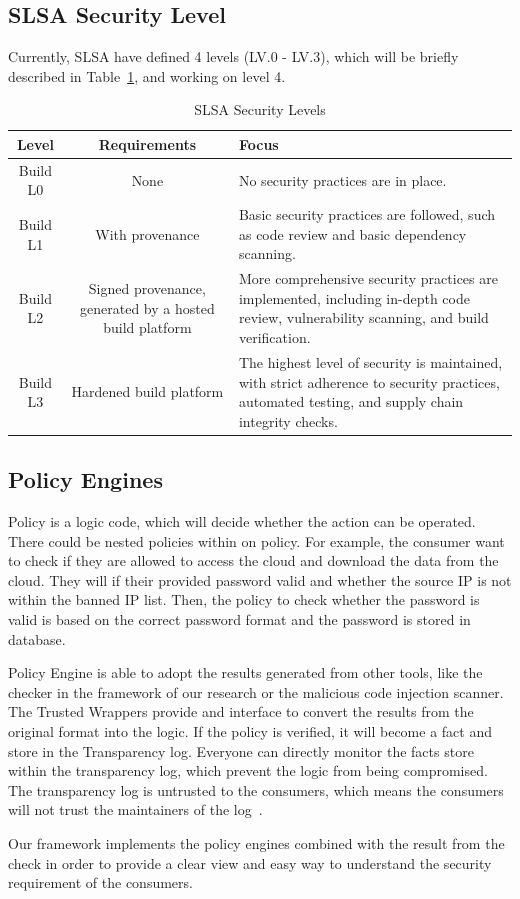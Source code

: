 \subsection{SLSA Security Level}
Currently, SLSA have defined 4 levels (LV.0 - LV.3), which will be 
briefly described in Table~\ref{tab:slsa-levels}, and working on level 4.
\begin{table}[ht]
  \centering
  \caption{SLSA Security Levels}
  \label{tab:slsa-levels}
  \begin{tabular}{|c|c|p{6cm}|}
  \hline
  \textbf{Level} & \textbf{Requirements} & \textbf{Focus} \\
  \hline
  Build L0 & None & No security practices are in place. \\
  \hline
  Build L1 & With provenance & Basic security practices are followed, such as code review and basic dependency scanning. \\
  \hline
  Build L2 & Signed provenance, generated by a hosted build platform & More comprehensive security practices are implemented, including in-depth code review, vulnerability scanning, and build verification. \\
  \hline
  Build L3 & Hardened build platform & The highest level of security is maintained, with strict adherence to security practices, automated testing, and supply chain integrity checks. \\
  \hline
  \end{tabular}
\end{table}

\subsection{Policy Engines}
Policy is a logic code, which will decide whether the action can be operated. There could be
nested policies within on policy. For example, the consumer want to check if they are allowed
to access the cloud and download the data from the cloud. They will if their provided password
valid and whether the source IP is not within the banned IP list. Then, the policy to check whether
the password is valid is based on the correct password format and the password is stored in database.

Policy Engine is able to adopt the results generated from other tools, like the checker in the framework of 
our research or the malicious code injection scanner. The Trusted Wrappers provide and interface to 
convert the results from the original format into the logic. If the policy is verified, it will become 
a fact and store in the Transparency log. Everyone can directly monitor the facts store within the transparency 
log, which prevent the logic from being compromised. The transparency log is untrusted to the consumers,
which means the consumers will not trust the maintainers of the log~\cite{ferraiuolo2022policy}.

Our framework implements the policy engines combined with the result from the check in order to provide a clear 
view and easy way to understand the security requirement of the consumers.


